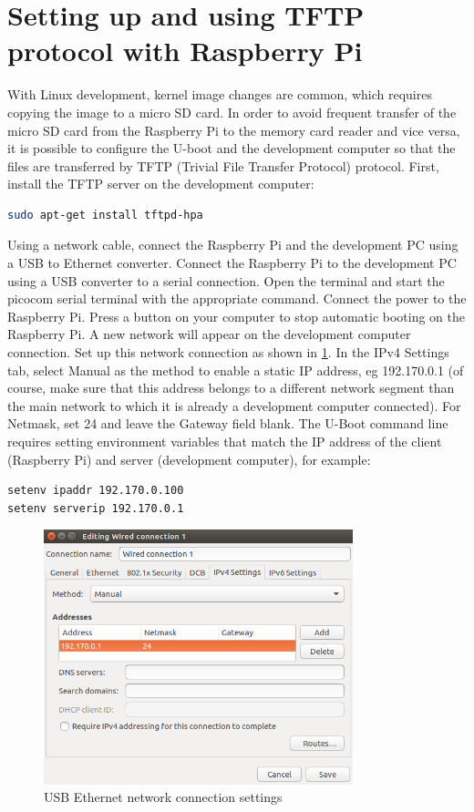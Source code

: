 \documentclass[11pt]{article}
\begin{document}
\section{Setting up and using TFTP protocol with Raspberry Pi}
With Linux development, kernel image changes are common, which requires copying
 the image to a micro SD card. In order to avoid frequent transfer of the micro
 SD card from the Raspberry Pi to the memory card reader and vice versa, it is
 possible to configure the U-boot and the development computer so that the
 files are transferred by TFTP (Trivial File Transfer Protocol) protocol.
 First, install the TFTP server on the development computer:
\begin{lstlisting}[language=bash]
sudo apt-get install tftpd-hpa
\end{lstlisting}
Using a network cable, connect the Raspberry Pi and the development PC using a
 USB to Ethernet converter. Connect the Raspberry Pi to the development PC
 using a USB converter to a serial connection. Open the terminal and start the
 picocom serial terminal with the appropriate command. Connect the power to the
 Raspberry Pi. Press a button on your computer to stop automatic booting on the
 Raspberry Pi. A new network will appear on the development computer
 connection. Set up this network connection as shown in
 \ref{fig:ubuntu-ethernet}. In the IPv4 Settings tab, select Manual as the
 method to enable a static IP address, eg 192.170.0.1 (of course, make sure
 that this address belongs to a different network segment than the main network
 to which it is already a development computer connected). For Netmask, set 24
 and leave the Gateway field blank. The U-Boot command line requires setting
 environment variables that match the IP address of the client (Raspberry Pi)
 and server (development computer), for example:
\begin{lstlisting}[language=bash]
setenv ipaddr 192.170.0.100
setenv serverip 192.170.0.1
\end{lstlisting}
\begin{figure}[h!]
\centering
\includegraphics[width=0.8\textwidth]{ubuntu-ethernet.png}
\captionsetup{justification=centering}
\caption{USB Ethernet network connection settings}
\label{fig:ubuntu-ethernet}
\end{figure}
\end{document}
